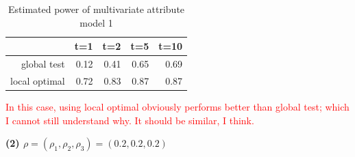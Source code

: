 \documentclass[12pt]{report}
\begin{document}
\begin{table}[ht]
\centering
\begin{tabular}{rrrrr}
  \hline
 & t=1 & t=2 & t=5 & t=10 \\ 
  \hline
global test & 0.12 & 0.41 & 0.65 & 0.69 \\ 
  local optimal & 0.72 & 0.83 & 0.87 & 0.87 \\ 
   \hline
\end{tabular}
\caption{Estimated power of multivariate attribute model 1}
\end{table}

\textcolor{red}{In this case, using local optimal obviously performs better than global test; which I cannot still understand why. It should be similar, I think.}


\newpage
\textbf{(2) $\rho = (\rho_{1}, \rho_{2}, \rho_{3}) = (0.2, 0.2, 0.2)$}
\end{document}
